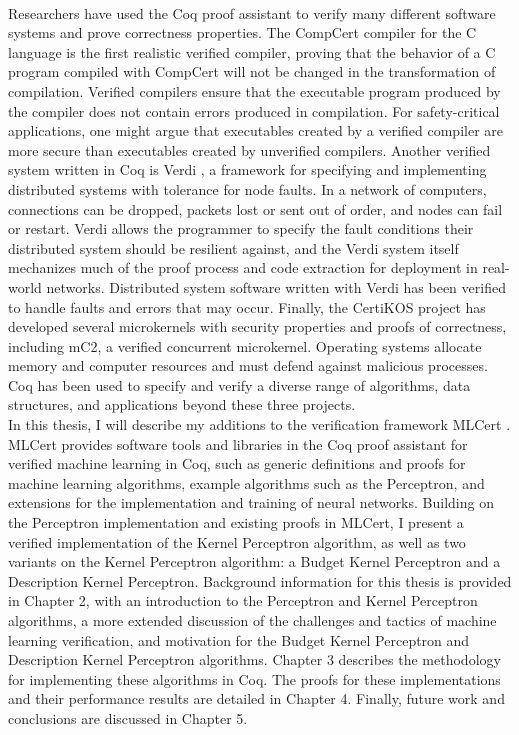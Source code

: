 \\Researchers have used the Coq proof assistant to verify many different software systems and prove correctness properties. The CompCert compiler for the C language \cite{Ler09} is the first realistic verified compiler, proving that the behavior of a C program compiled with CompCert will not be changed in the transformation of compilation. Verified compilers ensure that the executable program produced by the compiler does not contain errors produced in compilation. For safety-critical applications, one might argue that executables created by a verified compiler are more secure than executables created by unverified compilers. Another verified system written in Coq is Verdi \cite{WWP15}, a framework for specifying and implementing distributed systems with tolerance for node faults. In a network of computers, connections can be dropped, packets lost or sent out of order, and nodes can fail or restart. Verdi allows the programmer to specify the fault conditions their distributed system should be resilient against, and the Verdi system itself mechanizes much of the proof process and code extraction for deployment in real-world networks. Distributed system software written with Verdi has been verified to handle faults and errors that may occur. Finally, the CertiKOS project \cite{GSC16} has developed several microkernels with security properties and proofs of correctness, including mC2, a verified concurrent microkernel. Operating systems allocate memory and computer resources and must defend against malicious processes. Coq has been used to specify and verify a diverse range of algorithms, data structures, and applications beyond these three projects.
\\In this thesis, I will describe my additions to the verification framework MLCert \cite{MLC}. MLCert provides software tools and libraries in the Coq proof assistant for verified machine learning in Coq, such as generic definitions and proofs for machine learning algorithms, example algorithms such as the Perceptron, and extensions for the implementation and training of neural networks. Building on the Perceptron implementation and existing proofs in MLCert, I present a verified implementation of the Kernel Perceptron algorithm, as well as two variants on the Kernel Perceptron algorithm: a Budget Kernel Perceptron and a Description Kernel Perceptron. Background information for this thesis is provided in Chapter 2, with an introduction to the Perceptron and Kernel Perceptron algorithms, a more extended discussion of the challenges and tactics of machine learning verification, and motivation for the Budget Kernel Perceptron and Description Kernel Perceptron algorithms. Chapter 3 describes the methodology for implementing these algorithms in Coq. The proofs for these implementations and their performance results are detailed in Chapter 4. Finally, future work and conclusions are discussed in Chapter 5.

